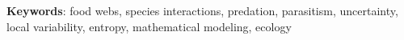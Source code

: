 \documentclass[12pt,twoside,phd]{dms}
\numberwithin{equation}{section}
\numberwithin{table}{chapter}
\numberwithin{figure}{chapter}
\begin{document}
\textbf{Keywords}: food webs, species interactions, predation, parasitism,
uncertainty, local variability, entropy, mathematical modeling, ecology


\francais
\cleardoublepage
{}  %
\tableofcontents
\cleardoublepage
{}  %
\listoftables
\cleardoublepage
{}
\listoffigures

\end{document}
